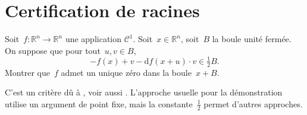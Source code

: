 \section{Certification de racines}

Soit~$f : \mathbb{R}^n\to \mathbb{R}^n$ une application $\mathcal{C}^1$.
Soit~$x \in \mathbb{R}^n$, soit~$B$ la boule unité fermée.
On suppose que pour tout~$u, v \in B$,
\[ - f(x) + v - \mathrm{d}f(x+u) \cdot v \in \tfrac 12 B. \]
Montrer que~$f$ admet un unique zéro dans la boule~$x + B$.

\begin{em}
  C'est un critère dû à \textcite{Krawczyk_1969}, voir aussi \textcite{Rump_1983}.
  L'approche usuelle pour la démonstration utilise un argument de point fixe, mais la constante~$\frac12$ permet d'autres approches.
\end{em}

